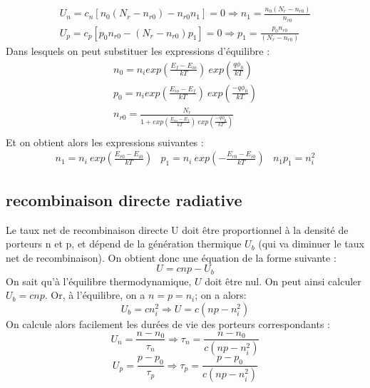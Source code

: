 \begin{equation}
\begin{array}{c}
U_n=c_n[n_0(N_r-n_{r0})-n_{r0}n_1]=0 \Rightarrow n_1=\frac{n_0(N_r-n_{r0})}{n_{r0}}
\\ 
U_p=c_p[p_0n_{r0}-(N_r-n_{r0})p_1] =0 \Rightarrow p_1=\frac{p_0n_{r0}}{(N_r-n_{r0})}
\end{array} 
\end{equation}
Dans lesquels on peut substituer les expressions d'équilibre :
\begin{equation}
\begin{array}{c}
n_0=n_i exp\left( \frac{E_f-E_{io}}{kT}\right)~exp\left( \frac{q\phi_0}{kT}\right)\\
p_0=n_i exp\left( \frac{E_{io}-E_f}{kT}\right)~exp\left( \frac{-q\phi_0}{kT}\right)\\
n_{r0}=\frac{N_r}{1+exp\left( \frac{E_{ro}-E_f}{kT}\right)~exp\left( \frac{-q\phi_0}{kT}\right)} \\
\end{array} 
\end{equation}
Et on obtient alors les expressions suivantes :
\begin{equation}
\begin{array}{ccc}
n_1=n_i ~exp\left(\frac{E_{r0}-E_{i0}}{kT}\right) & p_1=n_i ~exp\left(-\frac{E_{r0}-E_{i0}}{kT}\right) & n_1p_1=n_i^2
\end{array} 
\end{equation}
\subsection{recombinaison directe radiative}
Le taux net de recombinaison directe U doit être proportionnel à la densité de porteurs n et p, et dépend de la génération thermique $U_b$ (qui va diminuer le taux net de recombinaison). On obtient donc une équation de la forme suivante : 
\begin{equation}
U=cnp-U_b
\end{equation}
On sait qu'à l'équilibre thermodynamique, $U$ doit être nul. On peut ainsi calculer $U_b=cnp$. Or, à l'équilibre, on a $n=p=n_i$; on a alors:
\begin{equation}
U_b=cn_i^2 \Rightarrow U=c(np-n_i^2)
\end{equation}
On calcule alors facilement les durées de vie des porteurs correspondants :
\begin{equation}
U_n=\frac{n-n_0}{\tau _n} \Rightarrow \tau _n=\frac{n-n_0}{c(np-n_i^2)}
\end{equation} 
\begin{equation}
U_p=\frac{p-p_0}{\tau _p} \Rightarrow \tau _p=\frac{p-p_0}{c(np-n_i^2)}
\end{equation} 
